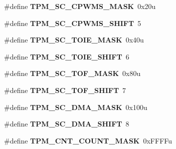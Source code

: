\begin{DoxyCompactItemize}
\mbox{\label{group___t_p_m___register___masks_ga2ed4f55ed6ec313d2f5c0cef0d9606e7}} 
\#define {\bfseries T\+P\+M\+\_\+\+S\+C\+\_\+\+C\+P\+W\+M\+S\+\_\+\+M\+A\+SK}~0x20u
\item 
\mbox{\label{group___t_p_m___register___masks_ga1bf84a093f66cf0f37c7b77ee16c32b3}} 
\#define {\bfseries T\+P\+M\+\_\+\+S\+C\+\_\+\+C\+P\+W\+M\+S\+\_\+\+S\+H\+I\+FT}~5
\item 
\mbox{\label{group___t_p_m___register___masks_ga67bad1290533531584e40005c865380d}} 
\#define {\bfseries T\+P\+M\+\_\+\+S\+C\+\_\+\+T\+O\+I\+E\+\_\+\+M\+A\+SK}~0x40u
\item 
\mbox{\label{group___t_p_m___register___masks_ga6ab65f7b4d48095133fd762e1595eb3a}} 
\#define {\bfseries T\+P\+M\+\_\+\+S\+C\+\_\+\+T\+O\+I\+E\+\_\+\+S\+H\+I\+FT}~6
\item 
\mbox{\label{group___t_p_m___register___masks_gae25305cad922790ffe882f8d4d423439}} 
\#define {\bfseries T\+P\+M\+\_\+\+S\+C\+\_\+\+T\+O\+F\+\_\+\+M\+A\+SK}~0x80u
\item 
\mbox{\label{group___t_p_m___register___masks_gaa58c9acc6863e92d142671b2da4b60a5}} 
\#define {\bfseries T\+P\+M\+\_\+\+S\+C\+\_\+\+T\+O\+F\+\_\+\+S\+H\+I\+FT}~7
\item 
\mbox{\label{group___t_p_m___register___masks_ga5d17b5a81f3f84eee65c94d5b0e7eca6}} 
\#define {\bfseries T\+P\+M\+\_\+\+S\+C\+\_\+\+D\+M\+A\+\_\+\+M\+A\+SK}~0x100u
\item 
\mbox{\label{group___t_p_m___register___masks_ga04279ab580223012d6e172ce92a5f8c5}} 
\#define {\bfseries T\+P\+M\+\_\+\+S\+C\+\_\+\+D\+M\+A\+\_\+\+S\+H\+I\+FT}~8
\item 
\mbox{\label{group___t_p_m___register___masks_gae4ca4e3ce211106290e584675dab1d28}} 
\#define {\bfseries T\+P\+M\+\_\+\+C\+N\+T\+\_\+\+C\+O\+U\+N\+T\+\_\+\+M\+A\+SK}~0x\+F\+F\+F\+Fu
\item 

\end{DoxyCompactItemize}
